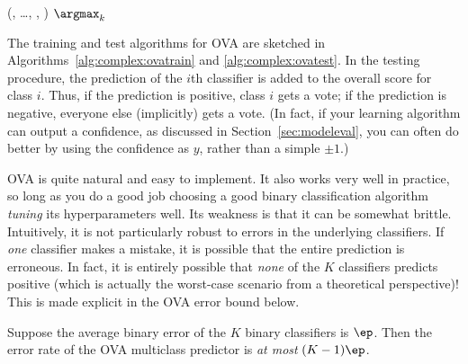   {(, \dots, , \VAR{$\hat\vx$})}
  {
\ENDFOR
\RETURN $\argmax_k$ 
}

The training and test algorithms for OVA are sketched in
Algorithms~\ref{alg:complex:ovatrain} and \ref{alg:complex:ovatest}.
In the testing procedure, the prediction of the $i$th classifier is
added to the overall score for class $i$.  Thus, if the prediction is
positive, class $i$ gets a vote; if the prediction is negative,
everyone else (implicitly) gets a vote.  (In fact, if your learning
algorithm can output a confidence, as discussed in Section~\ref{sec:modeleval},
you can often do better by using the confidence as $y$, rather than a
simple $\pm1$.)


OVA is quite natural and easy to implement.  It also
works very well in practice, so long as you do a good job choosing a
good binary classification algorithm \emph{tuning} its hyperparameters
well.  Its weakness is that it can be somewhat brittle.  Intuitively,
it is not particularly robust to errors in the underlying classifiers.
If \emph{one} classifier makes a mistake, it is possible that the
entire prediction is erroneous.  In fact, it is entirely possible that
\emph{none} of the $K$ classifiers predicts positive (which is
actually the worst-case scenario from a theoretical perspective)!
This is made explicit in the OVA error bound below.

\begin{theorem} \label{thm:complex:ova} Suppose the
  average binary error of the $K$ binary classifiers is $\ep$.  Then
  the error rate of the OVA multiclass predictor is \emph{at most}
  $(K-1) \ep$.
\end{theorem}

